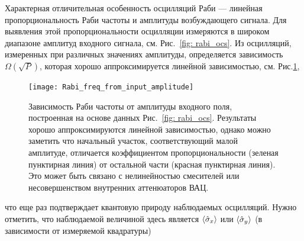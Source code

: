 Характерная отличительная особенность осцилляций Раби --- линейная пропорциональность Раби частоты и амплитуды возбуждающего сигнала. Для выявления этой пропорциональности осцилляции измеряются в широком диапазоне амплитуд входного сигнала, см. Рис.~\ref{fig: rabi_ocs}. Из осцилляций, измеренных при различных значениях амплитуды, определяется зависимость $\Omega(\sqrt{P})$, которая хорошо аппроксимируется линейной зависимостью, см. Рис.\ref{img: Rabi_from_amp_2},
\begin{figure}[ht]
	\centering
	\texttt{[image: Rabi\_freq\_from\_input\_amplitude]} 
	\caption[Зависимость Раби частоты от амплитуды входного поля.]{Зависимость Раби частоты от амплитуды входного поля, построенная на основе данных  Рис.~\ref{fig: rabi_ocs}. Результаты хорошо аппроксимируются линейной зависимостью, однако можно заметить что начальный участок, соответствующий малой амплитуде, отличается коэффициентом пропорциональности (зеленая пунктирная линия) от остальной части (красная пунктирная линия). Это может быть связано с нелинейностью смесителей или несовершенством внутренних аттенюаторов ВАЦ.}
	\label{img: Rabi_from_amp_2}  
\end{figure}
что еще раз подтверждает квантовую природу наблюдаемых осцилляций. Нужно отметить, что наблюдаемой величиной здесь является $\braket{\hat{\sigma}_x}$ или $\braket{\hat{\sigma}_y}$ (в зависимости от измеряемой квадратуры)
